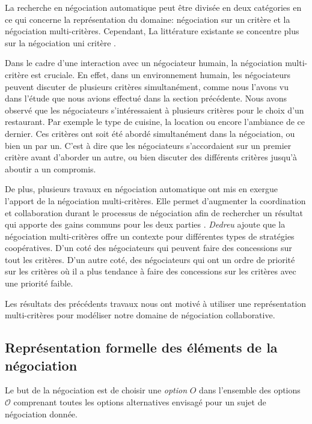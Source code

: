 	
		La recherche en négociation automatique peut être divisée en deux catégories en ce qui concerne la représentation du domaine: négociation sur un critère et la négociation multi-critères. Cependant, La littérature existante se concentre plus sur la négociation uni critère \cite{lai2008decentralized,lai2004literature}. 
		
		Dans le cadre d'une interaction avec un négociateur humain, la négociation multi-critère est cruciale. En effet, dans un environnement humain, les négociateurs peuvent discuter de plusieurs critères simultanément, comme nous l'avons vu dans l'étude que nous avions effectué dans la section précédente.  Nous avons observé que les négociateurs s'intéressaient à plusieurs critères pour le choix d'un restaurant. Par exemple le type de cuisine, la location ou encore l'ambiance de ce dernier. Ces critères ont soit été abordé simultanément dans la négociation, ou bien un par un. C'est à dire que les négociateurs s'accordaient sur un premier critère avant d'aborder un autre, ou bien discuter des différents critères jusqu'à aboutir a un compromis.
		
		De plus, plusieurs travaux en négociation automatique ont mis en exergue l'apport de la négociation multi-critères. Elle permet d'augmenter la coordination et collaboration durant le processus de négociation afin de rechercher un résultat qui apporte des gains communs pour les deux parties \cite{jonker2007agent,lai2008decentralized,lai2004literature}. \emph{Dedreu} ajoute que la négociation multi-critères offre un contexte pour différentes types de stratégies coopératives. D'un coté des négociateurs qui peuvent faire des concessions sur tout les critères. D'un autre coté, des négociateurs qui ont un ordre de priorité sur les critères où il a plus tendance à faire des concessions sur les critères avec une priorité faible. 
	
		Les résultats des précédents travaux nous ont motivé à utiliser une représentation multi-critères pour modéliser notre domaine de négociation collaborative. 
		
		\subsection{Représentation formelle des éléments de la négociation }	
		Le but de la négociation est de choisir une \textit{option} $O$ dans l'ensemble des options $\mathcal{O}$ comprenant toutes les options alternatives envisagé pour un sujet de négociation donnée. 
		

